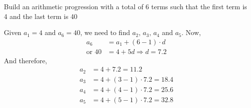 

\question[3] Build an arithmetic progression with a total of 6 terms such
that the first term is 4 and the last term is 40


\ifprintanswers
\fi 

\begin{solution}[\halfpage]
  Given $a_1 = 4$ and $a_6 = 40$, we need to find $a_2$, $a_3$, $a_4$ and $a_5$. Now,
  \begin{align}
     a_6 &= a_1 + (6-1)\cdot d \\
     \text{or } 40 &= 4 + 5d \Rightarrow d = 7.2
  \end{align}
  And therefore, 
  \begin{align}
     a_2 &= 4 + 7.2 = 11.2 \\
     a_3 &= 4 + (3-1)\cdot 7.2 = 18.4 \\
     a_4 &= 4 + (4-1)\cdot 7.2 = 25.6 \\
     a_5 &= 4 + (5-1)\cdot 7.2 = 32.8
  \end{align}

\end{solution}
